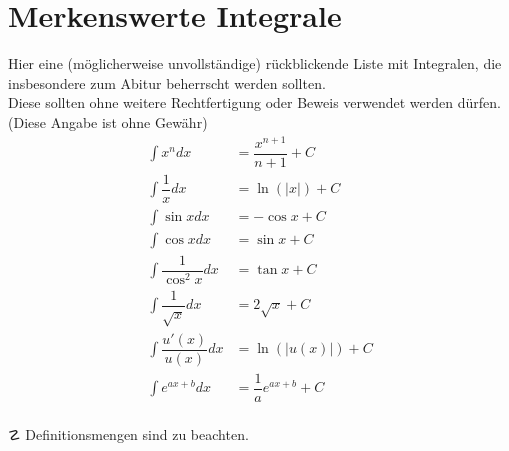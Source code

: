 \section{Merkenswerte Integrale}
Hier eine (möglicherweise unvollständige) rückblickende Liste mit Integralen, die insbesondere zum Abitur beherrscht werden sollten.\\
Diese sollten ohne weitere Rechtfertigung oder Beweis verwendet werden dürfen. (Diese Angabe ist ohne Gewähr)\\
\begin{align*}
  \int x^n dx &=\dfrac{x^{n+1}}{n+1} + C\\
  \int\dfrac{1}{x} dx &= \ln(|x|) + C\\
  \int\sin x dx &= -\cos x + C\\
  \int\cos x dx &= \sin x + C\\
  \int\dfrac{1}{\cos^2x}dx &= \tan x + C\\
  \int\dfrac{1}{\sqrt{x}}dx &= 2\sqrt{x} + C\\
  \int\dfrac{u'(x)}{u(x)} dx &= \ln(|u(x)|) + C\\
  \int e^{ax+b}dx &= \dfrac{1}{a}e^{ax+b} + C
\end{align*}
\\
$\danger$ Definitionsmengen sind zu beachten.
